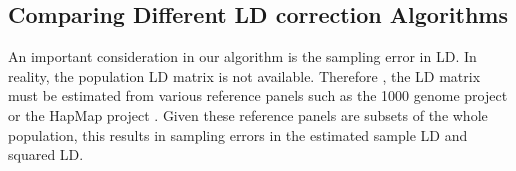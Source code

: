 %			
%			
%			
%			
	\subsection{Comparing Different LD correction Algorithms}
		\label{sec:ldSim}
		An important consideration in our algorithm is the sampling error in \gls{LD}.
		In reality, the population \gls{LD} matrix is not available.
		Therefore , the \gls{LD} matrix must be estimated from various reference panels such as the 1000 genome project \citep{Project2012} or the HapMap project \citep{Altshuler2010}.
		Given these reference panels are subsets of the whole population, this results in sampling errors in the estimated sample \gls{LD} and squared \gls{LD}.
		
